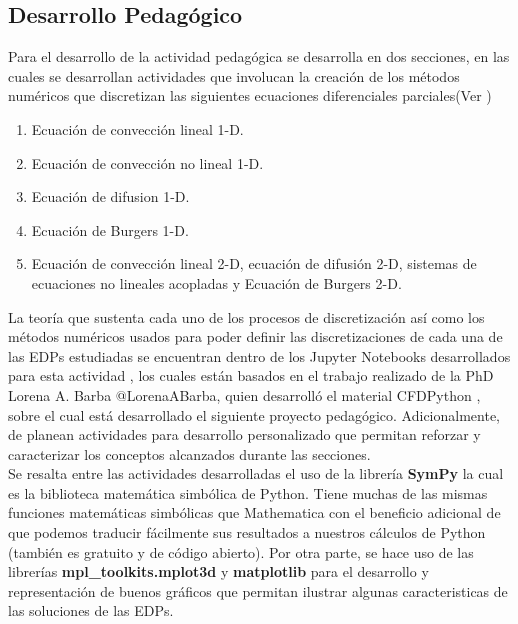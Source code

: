 \documentclass[A4,10pt]{article}
\begin{document}
\begin{multicols}{2}
\section{Desarrollo Pedagógico}

Para el desarrollo de la actividad pedagógica se desarrolla en dos secciones, en las cuales se desarrollan actividades que involucan la creación de los métodos numéricos que discretizan las siguientes ecuaciones diferenciales parciales(Ver \cite{LeonardoEC,LeonardoED,LeonardoEDP2d})

\begin{enumerate}
	\item Ecuación de convección lineal 1-D.
	\item Ecuación de convección no lineal 1-D.
	\item Ecuación de difusion 1-D.
	\item Ecuación de Burgers 1-D.
	\item Ecuación de convección lineal 2-D, ecuación de difusión 2-D, sistemas de ecuaciones no lineales acopladas y Ecuación de Burgers 2-D.
\end{enumerate}
La teoría que sustenta cada uno de los procesos de discretización así como los métodos numéricos usados para poder definir las discretizaciones de cada una de las EDPs estudiadas se encuentran dentro de los Jupyter Notebooks desarrollados para esta actividad \cite{LeonardoEC,LeonardoED,LeonardoEDP2d}, los cuales están basados en el trabajo realizado de la PhD Lorena A. Barba @LorenaABarba, quien desarrolló el material CFDPython \cite{Barba,Barbagroup}, sobre el cual está desarrollado el siguiente proyecto pedagógico. Adicionalmente, de planean actividades para desarrollo personalizado que permitan reforzar y caracterizar los conceptos alcanzados durante las secciones. \\

Se resalta entre las actividades desarrolladas el uso de la librería \textbf{SymPy} la cual es la biblioteca matemática simbólica de Python. Tiene muchas de las mismas funciones matemáticas simbólicas que Mathematica con el beneficio adicional de que podemos traducir fácilmente sus resultados a nuestros cálculos de Python (también es gratuito y de código abierto). Por otra parte, se hace uso de las librerías \textbf{mpl\_toolkits.mplot3d} y \textbf{matplotlib} para el desarrollo y representación de buenos gráficos que permitan ilustrar algunas caracteristicas de las soluciones de las EDPs.  

\end{multicols}
\end{document}
